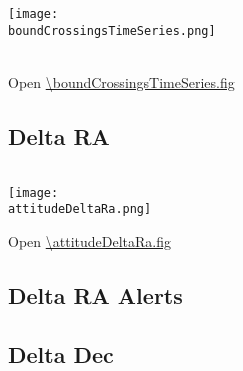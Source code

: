 \clearpage
\begin{center}
  \texttt{[image: \\boundCrossingsTimeSeries.png]}
\end{center}
\boundCrossingsTimeSeriesCaption\\
Open \url{\boundCrossingsTimeSeries.fig}

\clearpage

\subsection{Delta RA}

\begin{table}[htb!]
  \begin{tabularx}{\tablewidth}{X R}
    \toprule
    
    \bottomrule
  \end{tabularx}
\end{table} 

\begin{center}
  \texttt{[image: \\attitudeDeltaRa.png]}
\end{center}
Open \url{\attitudeDeltaRa.fig}

\clearpage

\subsection{Delta RA Alerts}

%

\clearpage

\subsection{Delta Dec}


